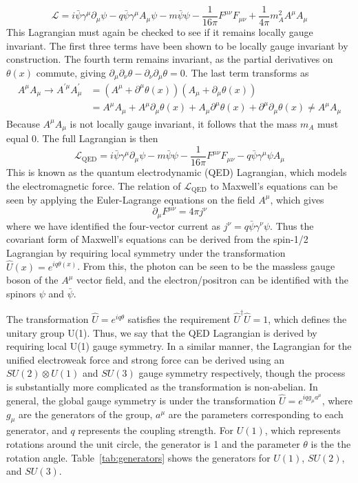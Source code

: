 \begin{equation}
	\mathcal{L}=i\bar{\psi}\gamma^\mu\partial_\mu\psi-q\bar{\psi}\gamma^\mu A_\mu\psi-m\bar{\psi}\psi-\frac{1}{16\pi}F^{\mu\nu}F_{\mu\nu}+\frac{1}{4\pi}m_{A}^2A^\mu A_\mu
\end{equation}
This Lagrangian must again be checked to see if it remains locally gauge invariant. The first three terms have been shown to be locally gauge invariant by construction. The fourth term remains invariant, as the partial derivatives on $\theta(x)$ commute, giving $\partial_\mu\partial_\nu\theta-\partial_\nu\partial_\mu\theta=0$. The last term transforms as
\begin{align}
	A^\mu A_\mu\to A^{\prime\mu}A_\mu^\prime&=(A^\mu+\partial^\mu\theta(x))(A_\mu+\partial_\mu\theta(x))\\
	&=A^\mu A_\mu+A^\mu\partial_\mu\theta(x)+A_\mu\partial^\mu\theta(x)+\partial^\mu\partial_\mu\theta(x)\neq A^\mu A_\mu
\end{align}
Because $A^\mu A_\mu$ is not locally gauge invariant, it follows that the mass $m_{A}$ must equal 0. The full Lagrangian is then
\begin{equation}
	\mathcal{L}_\text{QED}=i\bar{\psi}\gamma^\mu\partial_\mu\psi-m\bar{\psi}\psi-\frac{1}{16\pi}F^{\mu\nu}F_{\mu\nu}-q\bar{\psi}\gamma^\mu\psi A_\mu
\end{equation}
This is known as the quantum electrodynamic (QED) Lagrangian, which models the electromagnetic force. The relation of $\mathcal{L}_\text{QED}$ to Maxwell's equations can be seen by applying the Euler-Lagrange equations on the field $A^\mu$, which gives
\begin{equation}
	\label{eq:maxwell}
	\partial_\mu F^{\mu\nu}=4\pi j^\nu
\end{equation}
where we have identified the four-vector current as $j^\nu=q\bar{\psi}\gamma^\nu\psi$. Thus the covariant form of Maxwell's equations can be derived from the spin-1/2 Lagrangian by requiring local symmetry under the transformation $\hat{U}(x)=e^{iq\theta(x)}$. From this, the photon can be seen to be the massless gauge boson of the $A^\mu$ vector field, and the electron/positron can be identified with the spinors $\psi$ and $\bar{\psi}$.

The transformation $\hat{U}=e^{iq\theta}$ satisfies the requirement $\hat{U}^\dagger\hat{U}=1$, which defines the unitary group U(1). Thus, we say that the QED Lagrangian is derived by requiring local U(1) gauge symmetry. In a similar manner, the Lagrangian for the unified electroweak force and strong force can be derived using an $SU(2)\otimes U(1)$ and $SU(3)$ gauge symmetry respectively, though the process is substantially more complicated as the transformation is non-abelian. In general, the global gauge symmetry is under the transformation $\hat{U}=e^{iqg_\mu a^\mu}$, where $g_\mu$ are the generators of the group, $a^\mu$ are the parameters corresponding to each generator, and $q$ represents the coupling strength. For $U(1)$, which represents rotations around the unit circle, the generator is 1 and the parameter $\theta$ is the  the rotation angle. Table~\ref{tab:generators} shows the generators for $U(1)$, $SU(2)$, and $SU(3)$.

